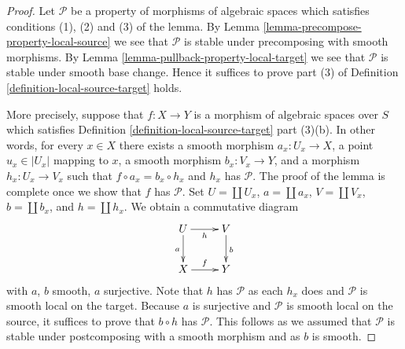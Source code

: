 \documentclass{stacks-project}
\theoremstyle{plain}
\theoremstyle{definition}
\theoremstyle{remark}
\numberwithin{equation}{subsection}
\begin{document}
\begin{proof}
Let $\mathcal{P}$ be a property of morphisms of algebraic spaces which
satisfies conditions (1), (2) and (3) of the lemma. By
Lemma \ref{lemma-precompose-property-local-source}
we see that $\mathcal{P}$ is stable under precomposing with
smooth morphisms. By
Lemma \ref{lemma-pullback-property-local-target}
we see that $\mathcal{P}$ is stable under smooth base change.
Hence it suffices to prove part (3) of
Definition \ref{definition-local-source-target}
holds.

\medskip\noindent
More precisely, suppose that $f : X \to Y$ is a morphism
of algebraic spaces over $S$ which satisfies
Definition \ref{definition-local-source-target} part (3)(b).
In other words, for every $x \in X$ there exists a smooth
morphism $a_x : U_x \to X$, a point $u_x \in |U_x|$ mapping to $x$,
a smooth morphism $b_x : V_x \to Y$, and a morphism $h_x : U_x \to V_x$
such that $f \circ a_x = b_x \circ h_x$ and $h_x$ has $\mathcal{P}$.
The proof of the lemma is complete once we show that $f$ has $\mathcal{P}$.
Set $U = \coprod U_x$, $a = \coprod a_x$, $V = \coprod V_x$,
$b = \coprod b_x$, and $h = \coprod h_x$. We obtain a
commutative diagram
$$
\xymatrix{
U \ar[d]_a \ar[r]_h & V \ar[d]^b \\
X \ar[r]^f & Y
}
$$
with $a$, $b$ smooth, $a$ surjective. Note that $h$ has $\mathcal{P}$
as each $h_x$ does and $\mathcal{P}$ is smooth local on the target.
Because $a$ is surjective and $\mathcal{P}$ is smooth local on the source,
it suffices to prove that $b \circ h$ has $\mathcal{P}$.
This follows as we assumed that $\mathcal{P}$ is stable under
postcomposing with a smooth morphism and as $b$ is smooth.
\end{proof}
\end{document}
